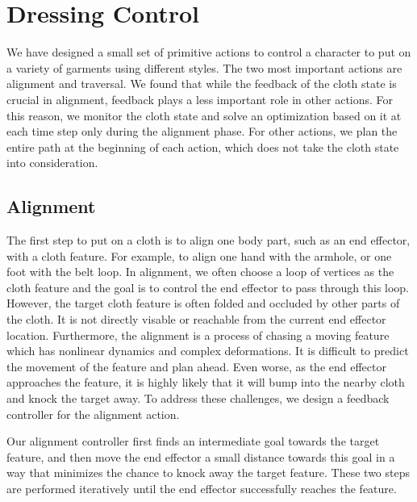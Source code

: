 \section{Dressing Control}

We have designed a small set of primitive actions to control a character to put on a variety of garments using different styles. The two most important actions are alignment and traversal. We found that while the feedback of the cloth state is crucial in alignment, feedback plays a less important role in other actions. For this reason, we monitor the cloth state and solve an optimization based on it at each time step only during the alignment phase. For other actions, we plan the entire path at the beginning of each action, which does not take the cloth state into consideration.

\subsection{Alignment}

The first step to put on a cloth is to align one body part, such as an end effector, with a cloth feature. For example, to align one hand with the armhole, or one foot with the belt loop. In alignment, we often choose a loop of vertices as the cloth feature and the goal is to control the end effector to pass through this loop. However, the target cloth feature is often folded and occluded by other parts of the cloth. It is not directly visable or reachable from the current end effector location. Furthermore, the alignment is a process of chasing a moving feature which has nonlinear dynamics and complex deformations. It is difficult to predict the movement of the feature and plan ahead. Even worse, as the end effector approaches the feature, it is highly likely that it will bump into the nearby cloth and knock the target away.  To address these challenges, we design a feedback controller for the alignment action.

Our alignment controller first finds an intermediate goal towards the target feature, and then move the end effector a small distance towards this goal in a way that minimizes the chance to knock away the target feature. These two steps are performed iteratively until the end effector successfully reaches the feature. 

